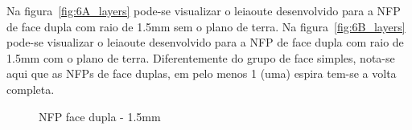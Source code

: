 Na figura~\ref{fig:6A_layers} pode-se visualizar o leiaoute desenvolvido para a NFP de face dupla com raio de 1.5mm sem o plano de terra. Na figura~\ref{fig:6B_layers} pode-se visualizar o leiaoute desenvolvido para a NFP de face dupla com raio de 1.5mm com o plano de terra. Diferentemente do grupo de face simples, nota-se aqui que as NFPs de face duplas, em pelo menos 1 (uma) espira tem-se a volta completa. 
\begin{figure}[htb!]
	\centering
 	\caption{NFP face dupla - 1.5mm}
\end{figure}


